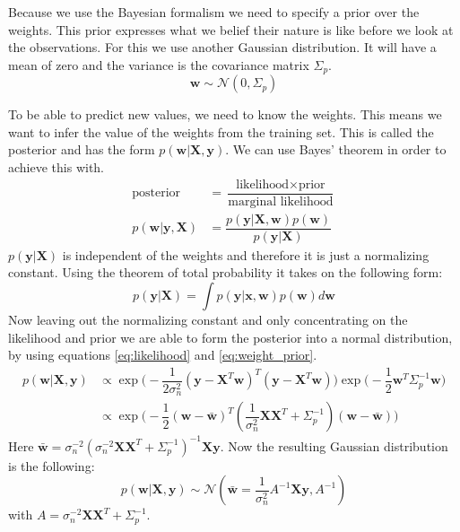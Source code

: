 Because we use the Bayesian formalism we need to specify a prior over the weights. This prior expresses what we belief their nature is like before we look at the observations. For this we use another Gaussian distribution. It will have a mean of zero and the variance is the covariance matrix $\Sigma_p$.\cite[p. 9]{Rasmussen:2005:GPM:1162254}
\begin{equation}\label{eq:weight_prior}
\mathbf{w} \sim \mathcal{N}(0,\Sigma_p)
\end{equation}

To be able to predict new values, we need to know the weights. This means we want to infer the value of the weights from the training set. This is called the posterior and has the form $p(\mathbf{w}|\mathbf{X},\mathbf{y})$. We can use Bayes' theorem in order to achieve this with.
\begin{equation}\label{eq:bayestheorem}
\begin{aligned}
\text{posterior} &= \dfrac{\text{likelihood} \times \text{prior}}{\text{marginal likelihood}}\\
p(\mathbf{w}|\mathbf{y},\mathbf{X}) &= \dfrac{p(\mathbf{y}|\mathbf{X},\mathbf{w})p(\mathbf{w})}{p(\mathbf{y}|\mathbf{X})}
\end{aligned}
\end{equation}
$p(\mathbf{y}|\mathbf{X})$ is independent of the weights and therefore it is just a normalizing constant. Using the theorem of total probability it takes on the following form:
\begin{equation}\label{eq:nc_tp}
p(\mathbf{y}|\mathbf{X}) = \int p(\mathbf{y}|\mathbf{x},\mathbf{w})p(\mathbf{w})d\mathbf{w}
\end{equation}
Now leaving out the normalizing constant and only concentrating on the likelihood and prior we are able to form the posterior into a normal distribution, by using equations \ref{eq:likelihood} and \ref{eq:weight_prior}.
\begin{equation}\label{eq:posterior_distri}
\begin{aligned}
p(\mathbf{w}|\mathbf{X},\mathbf{y}) &\propto \exp\big(-\dfrac{1}{2\sigma_n^2}(\mathbf{y}-\mathbf{X}^T\mathbf{w})^T(\mathbf{y}-\mathbf{X}^T\mathbf{w})\big)\exp \big(-\dfrac{1}{2}\mathbf{w}^T\Sigma_p^{-1}\mathbf{w}\big)\\
&\propto \exp \big(-\dfrac{1}{2}(\mathbf{w}-\bar{\mathbf{w}})^T(\dfrac{1}{\sigma_n^2}\mathbf{X}\mathbf{X}^T+\Sigma_p^{-1})(\mathbf{w}-\bar{\mathbf{w}})\big)
\end{aligned}
\end{equation}
Here $\bar{\mathbf{w}} = \sigma_n^{-2}(\sigma_n^{-2}\mathbf{X}\mathbf{X}^T+\Sigma_p^{-1})^{-1}\mathbf{X}\mathbf{y}$. Now the resulting Gaussian distribution is the following:
\begin{equation}\label{eq:posterior_gauss}
p(\mathbf{w}|\mathbf{X},\mathbf{y}) \sim \mathcal{N}(\bar{\mathbf{w}}=\dfrac{1}{\sigma_n^2}A^{-1}\mathbf{X}\mathbf{y},A^{-1})
\end{equation}
with $A = \sigma_n^{-2}\mathbf{X}\mathbf{X}^T + \Sigma_p^{-1}$. \cite[p. 9]{Rasmussen:2005:GPM:1162254}

